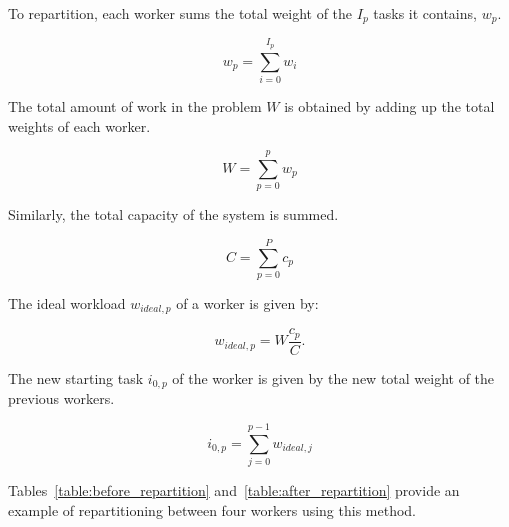 To repartition, each worker sums the total weight of the \(I_p\) tasks it contains, \(w_p\).

\begin{equation}
	w_p = \sum_{i = 0}^{I_p}w_i
\end{equation}

\noindent
The total amount of work in the problem \(W\) is obtained by adding up the total weights of each
worker.

\begin{equation}
	W = \sum_{p = 0}^{p}w_p
\end{equation}

\noindent
Similarly, the total capacity of the system is summed.

\begin{equation}
	C = \sum_{p = 0}^{P}c_p
\end{equation}

\noindent
The ideal workload \(w_{ideal,p}\) of a worker is given by:

\begin{equation}
	w_{ideal,p} = W \frac{c_p}{C}.
\end{equation}

\noindent
The new starting task \(i_{0, p}\) of the worker is given by the new total weight of the previous
workers.

\begin{equation}
	i_{0, p} = \sum_{j = 0}^{p - 1}w_{ideal,j}
\end{equation}

Tables~\ref{table:before_repartition} and~\ref{table:after_repartition} provide an example of
repartitioning between four workers using this method.

